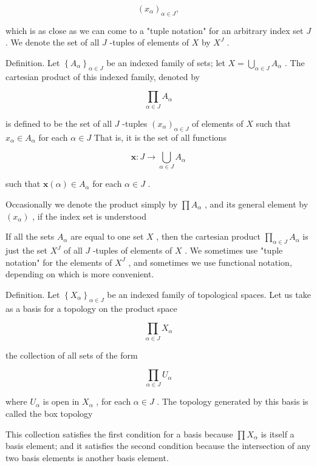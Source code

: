 \[
{\left( {x}_{\alpha }\right) }_{\alpha  \in  J},
\]

which is as close as we can come to a "tuple notation" for an arbitrary index set \(J\) . We denote the set of all \(J\) -tuples of elements of \(X\) by \({X}^{J}\) .

Definition. Let \({\left\{  {A}_{\alpha }\right\}  }_{\alpha  \in  J}\) be an indexed family of sets; let \(X = \mathop{\bigcup }\limits_{{\alpha  \in  J}}{A}_{\alpha }\) . The cartesian product of this indexed family, denoted by

\[
\mathop{\prod }\limits_{{\alpha  \in  J}}{A}_{\alpha }
\]

is defined to be the set of all \(J\) -tuples \({\left( {x}_{\alpha }\right) }_{\alpha  \in  J}\) of elements of \(X\) such that \({x}_{\alpha } \in  {A}_{\alpha }\) for each \(\alpha  \in  J\) That is, it is the set of all functions

\[
\mathbf{x} : J \rightarrow  \mathop{\bigcup }\limits_{{\alpha  \in  J}}{A}_{\alpha }
\]

such that \(\mathbf{x}\left( \alpha \right)  \in  {A}_{\alpha }\) for each \(\alpha  \in  J\) .

Occasionally we denote the product simply by \(\prod {A}_{\alpha }\) , and its general element by \(\left( {x}_{\alpha }\right)\) , if the index set is understood

If all the sets \({A}_{\alpha }\) are equal to one set \(X\) , then the cartesian product \(\mathop{\prod }\limits_{{\alpha  \in  J}}{A}_{\alpha }\) is just the set \({X}^{J}\) of all \(J\) -tuples of elements of \(X\) . We sometimes use "tuple notation" for the elements of \({X}^{J}\) , and sometimes we use functional notation, depending on which is more convenient.

Definition. Let \({\left\{  {X}_{\alpha }\right\}  }_{\alpha  \in  J}\) be an indexed family of topological spaces. Let us take as a basis for a topology on the product space

\[
\mathop{\prod }\limits_{{\alpha  \in  J}}{X}_{\alpha }
\]

the collection of all sets of the form

\[
\mathop{\prod }\limits_{{\alpha  \in  J}}{U}_{\alpha }
\]

where \({U}_{\alpha }\) is open in \({X}_{\alpha }\) , for each \(\alpha  \in  J\) . The topology generated by this basis is called the box topology

This collection satisfies the first condition for a basis because \(\prod {X}_{\alpha }\) is itself a basis element; and it satisfies the second condition because the intersection of any two basis elements is another basis element.

